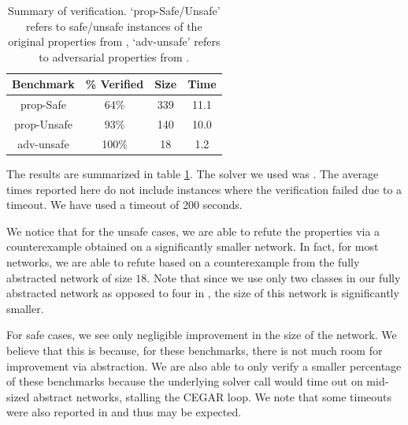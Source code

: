 \begin{table}
\begin{tabular}{ |c|c|c|c| }
\hline
Benchmark   & \% Verified & Size     & Time \\ 
\hline
prop-Safe   &   64\%      & 339      & 11.1  \\
prop-Unsafe &   93\%      & 140      & 10.0  \\
adv-unsafe  &  100\%      & 18       & 1.2   \\
\hline                                                                
\end{tabular}
\caption{Summary of \acasxu verification. `prop-Safe/Unsafe' refers to
safe/unsafe instances of the original properties from \cite{reluplex},
`adv-unsafe' refers to adversarial properties from \cite{cegar-nn}. }
\label{t:acas-verif}
\end{table}

The results are summarized in table \ref{t:acas-verif}. The solver we used was
\abcrown. The average times reported here do not include instances where the
verification failed due to a timeout. We have used a timeout of 200 seconds.

We notice that for the unsafe cases, we are able to refute the
properties via a counterexample obtained on a significantly smaller network. In
fact, for most networks, we are able to refute based on a counterexample from
the fully abstracted network of size $18$. Note that since we use only two classes in our
fully abstracted network as opposed to four in \cite{cegar-nn}, the size of this
network is significantly smaller. 

For safe cases, we see only negligible improvement in the size of the network.
We believe that this is because, for these benchmarks, there is not much room for
improvement via abstraction. We are also able to only verify a smaller
percentage of these benchmarks because the underlying solver call would time
out on mid-sized abstract networks, stalling
the CEGAR loop. We note that some timeouts were also reported in
\cite{cegar-nn} and thus may be expected.

